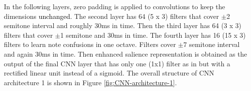 \documentclass{article}
\newcommand{\dbcor}[2]{{\textcolor{black}{#2}}}
\newcommand{\jb}[1]{{\textcolor{black}{#1}}}
\begin{document}


In the following layers, zero padding is applied to convolutions to keep the dimensions \dbcor{fixed}{unchanged}. The second layer has 64 (5 x 3) filters that cover $\pm$2 semitone interval and roughly 30ms in time. Then the third layer has 64 (3 x 3) filters that cover $\pm$1 semitone and 30ms in time. 
The fourth layer has 16 (15 x 3) filters to learn note confusions in one octave. Filters cover $\pm7$ semitone interval and again 30ms in time. Then enhanced salience representation is obtained as the output of the final CNN layer that has only one (1x1) filter as in \cite{bittner2017_deep} but with a rectified linear unit instead of a sigmoid. 
The overall structure of CNN architecture 1 is shown in Figure \ref{fig:CNN-architecture-1}.
\end{document}
